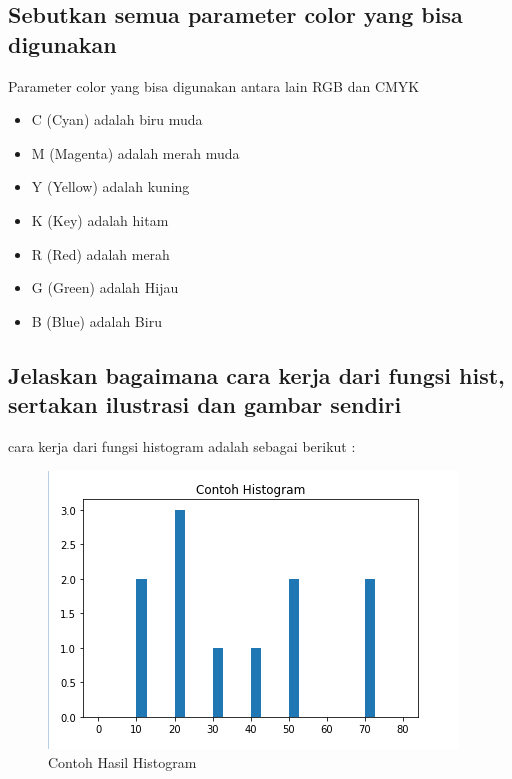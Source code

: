 \subsection{Sebutkan semua parameter color yang bisa digunakan}
Parameter color yang bisa digunakan antara lain RGB dan CMYK
\begin{itemize}
    \item C (Cyan) adalah biru muda
    \item M (Magenta) adalah merah muda
    \item Y (Yellow) adalah kuning
    \item K (Key) adalah hitam
    \item R (Red) adalah merah
    \item G (Green) adalah Hijau
    \item B (Blue) adalah Biru
    
\end{itemize}

\subsection{Jelaskan bagaimana cara kerja dari fungsi hist, sertakan ilustrasi dan gambar sendiri}
cara kerja dari fungsi histogram adalah sebagai berikut :


\begin{figure}[h]
\centering
\includegraphics[scale=0.7]{figures/6/Teori/1174038/3.png}
\caption{Contoh Hasil Histogram}
\label{fig:contoh}
\end{figure}

